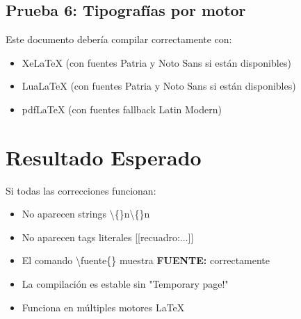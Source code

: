 \documentclass{sener2025}
\begin{document}

\subsection{Prueba 6: Tipografías por motor}

Este documento debería compilar correctamente con:
\begin{itemize}
  \item XeLaTeX (con fuentes Patria y Noto Sans si están disponibles)
  \item LuaLaTeX (con fuentes Patria y Noto Sans si están disponibles)  
  \item pdfLaTeX (con fuentes fallback Latin Modern)
\end{itemize}

\section{Resultado Esperado}

Si todas las correcciones funcionan:
\begin{itemize}
  \item No aparecen strings \textbackslash\{\}n\textbackslash\{\}n
  \item No aparecen tags literales [[recuadro:...]]
  \item El comando \textbackslash fuente\{\} muestra \textbf{FUENTE:} correctamente
  \item La compilación es estable sin "Temporary page!"
  \item Funciona en múltiples motores LaTeX
\end{itemize}
\end{document}
